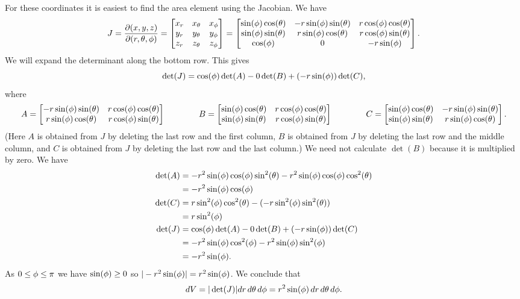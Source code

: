 \documentclass[reqno]{amsart}
\theoremstyle{definition}
\begin{document}
For these coordinates it is easiest to find the area element using the
Jacobian.  We have 
\[ J = \frac{\partial(x,y,z)}{\partial(r,\theta,\phi)}
     = \left[\begin{matrix} x_r & x_\theta & x_\phi \\
            y_r & y_\theta & y_\phi \\
            z_r & z_\theta & z_\phi \end{matrix}\right] 
     = \left[\begin{matrix} \sin(\phi)\cos(\theta) & -r\sin(\phi)\sin(\theta) & r\cos(\phi)\cos(\theta) \\
            \sin(\phi)\sin(\theta) &  r\sin(\phi)\cos(\theta) & r\cos(\phi)\sin(\theta) \\
            \cos(\phi)           &  0                     & -r\sin(\phi) \end{matrix}\right].
\]
We will expand the determinant along the bottom row.  This gives 
\[ \det(J) = \cos(\phi)\det(A) - 0\det(B) + (-r\sin(\phi))\det(C), \]
where
{\tiny
\[ A = \left[\begin{matrix} -r\sin(\phi)\sin(\theta) & r\cos(\phi)\cos(\theta) \\
             r\sin(\phi)\cos(\theta) & r\cos(\phi)\sin(\theta) \end{matrix}\right]
   \hspace{4em}
   B = \left[\begin{matrix} \sin(\phi)\cos(\theta) &  r\cos(\phi)\cos(\theta) \\
            \sin(\phi)\sin(\theta) &  r\cos(\phi)\sin(\theta) \end{matrix}\right]
   \hspace{4em}
   C = \left[\begin{matrix} \sin(\phi)\cos(\theta) & -r\sin(\phi)\sin(\theta) \\
            \sin(\phi)\sin(\theta) &  r\sin(\phi)\cos(\theta) \end{matrix}\right].
\]}
(Here $A$ is obtained from $J$ by deleting the last row and the first
column, $B$ is obtained from $J$ by deleting the last row and the
middle column, and $C$ is obtained from $J$ by deleting the last row
and the last column.)  We need not calculate $\det(B)$ because it is
multiplied by zero.  We have
\begin{align*}
 \det(A) &= -r^2\sin(\phi)\cos(\phi)\sin^2(\theta)
            -r^2\sin(\phi)\cos(\phi)\cos^2(\theta) \\
         &= -r^2\sin(\phi)\cos(\phi) \\
 \det(C) &= r\sin^2(\phi)\cos^2(\theta)-(-r\sin^2(\phi)\sin^2(\theta)) \\
         &= r\sin^2(\phi) \\
 \det(J) &= \cos(\phi)\det(A) - 0\det(B) + (-r\sin(\phi))\det(C) \\
         &= -r^2\sin(\phi)\cos^2(\phi) -r^2\sin(\phi)\sin^2(\phi) \\
         &= -r^2\sin(\phi).
\end{align*}
As $0\leq\phi\leq\pi$ we have $\sin(\phi)\geq 0$ so
$|-r^2\sin(\phi)|=r^2\sin(\phi)$.  We conclude that 
\[ dV = |\det(J)| dr\,d\theta\,d\phi = r^2\sin(\phi)\,dr\,d\theta\,d\phi. \]
\end{document}
